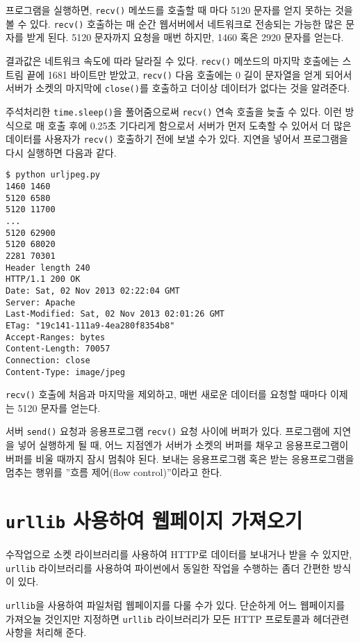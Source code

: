 프로그램을 실행하면, {\tt recv()} 메쏘드를 호출할 때 마다 5120 문자를 얻지 못하는 것을 볼 수 있다.
{\tt recv()} 호출하는 매 순간 웹서버에서 네트워크로 전송되는 가능한 많은 문자를 받게 된다. 
5120 문자까지 요청을 매번 하지만, 1460 혹은 2920 문자를 얻는다. 

결과값은 네트워크 속도에 따라 달라질 수 있다. {\tt recv()} 메쏘드의 마지막 호출에는 스트림 끝에 1681 바이트만 받았고,
{\tt recv()} 다음 호출에는 0 길이 문자열을 얻게 되어서 서버가 소켓의 마지막에 {\tt close()}를 호출하고 
더이상 데이터가 없다는 것을 알려준다.


주석처리한 {\tt time.sleep()}을 풀어줌으로써 {\tt recv()} 연속 호출을 늦출 수 있다.
이런 방식으로 매 호출 후에 0.25초 기다리게 함으로서 서버가 먼저 도축할 수 있어서 더 많은 데이터를 
사용자가 {\tt recv()} 호출하기 전에 보낼 수가 있다.
지연을 넣어서 프로그램을 다시 실행하면 다음과 같다.

\beforeverb
\begin{verbatim}
$ python urljpeg.py 
1460 1460
5120 6580
5120 11700
...
5120 62900
5120 68020
2281 70301
Header length 240
HTTP/1.1 200 OK
Date: Sat, 02 Nov 2013 02:22:04 GMT
Server: Apache
Last-Modified: Sat, 02 Nov 2013 02:01:26 GMT
ETag: "19c141-111a9-4ea280f8354b8"
Accept-Ranges: bytes
Content-Length: 70057
Connection: close
Content-Type: image/jpeg
\end{verbatim}
\afterverb
%

{\tt recv()} 호출에 처음과 마지막을 제외하고, 매번 새로운 데이터를 요청할 때마다 이제는 5120 문자를 얻는다. 

서버 {\tt send()} 요청과 응용프로그램 {\tt recv()} 요청 사이에 버퍼가 있다.
프로그램에 지연을 넣어 실행하게 될 때, 어느 지점엔가 서버가 소켓의 버퍼를 채우고 응용프로그램이 버퍼를 비울 때까지
잠시 멈춰야 된다. 보내는 응용프로그램 혹은 받는 응용프로그램을 멈추는 행위를 ''흐름 제어(flow control)''이라고 한다.


\section{{\tt urllib} 사용하여 웹페이지 가져오기}

수작업으로 소켓 라이브러리를 사용하여 HTTP로 데이터를 보내거나 받을 수 있지만,
{\tt urllib} 라이브러리를 사용하여 파이썬에서 동일한 작업을 수행하는 좀더 간편한 방식이 있다.

{\tt urllib}을 사용하여 파일처럼 웹페이지를 다룰 수가 있다.
단순하게 어느 웹페이지를 가져오늘 것인지만 지정하면 {\tt urllib} 라이브러리가 모든 HTTP 프로토콜과 헤더관련 사항을 처리해 준다.

